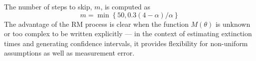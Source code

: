 The number of steps to skip, $m$, is computed as \[
m = \min \left\{ 50, 0.3(4-\alpha)/\alpha \right\}
\]
The advantage of the RM process is clear when the function $M(\theta)$ is unknown or too complex to be written explicitly --- in the context of estimating extinction times and generating confidence intervals, it provides flexibility for non-uniform assumptions as well as measurement error.